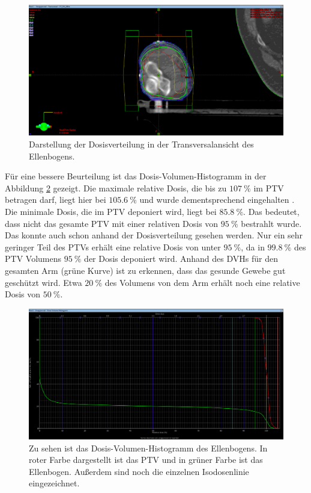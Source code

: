 \begin{figure}[H]
	\centering
	\includegraphics[width=\textwidth]{../Bilder/EllenbogenZ.png}
	\caption{Darstellung der Dosisverteilung in der Transversalansicht des Ellenbogens.}
	\label{fig:ellenbogenz}
\end{figure}

Für eine bessere Beurteilung ist das Dosis-Volumen-Histogramm in der Abbildung \ref{fig:dvhellenbogeneinzel} gezeigt.
Die maximale relative Dosis, die bis zu $\SI{107}{\percent}$ im PTV betragen darf, liegt hier bei $\SI{105,6}{\percent}$
und wurde dementsprechend eingehalten \cite{ICRU}.
Die minimale Dosis, die im PTV deponiert wird, liegt bei $\SI{85,8}{\percent}$.
Das bedeutet, dass nicht das gesamte PTV mit einer relativen Dosis von $\SI{95}{\percent}$ bestrahlt wurde.
Das konnte auch schon anhand der Dosisverteilung gesehen werden.
Nur ein sehr geringer Teil des PTVs erhält eine relative Dosis von unter $\SI{95}{\percent}$, da in $\SI{99.8}{\percent}$ des PTV Volumens
$\SI{95}{\percent}$ der Dosis deponiert wird.
Anhand des DVHs für den gesamten Arm (grüne Kurve) ist zu erkennen, dass das gesunde Gewebe gut geschützt wird.
Etwa $\SI{20}{\percent}$ des Volumens von dem Arm erhält noch eine relative Dosis von $\SI{50}{\percent}$.

\begin{figure}[H]
	\centering
	\includegraphics[width=\textwidth]{../Bilder/DVH_EllenbogenEinzel.png}
	\caption{Zu sehen ist das Dosis-Volumen-Histogramm des Ellenbogens. In roter Farbe dargestellt ist das PTV und in grüner Farbe ist das Ellenbogen. Außerdem sind noch die einzelnen Isodosenlinie eingezeichnet.}
	\label{fig:dvhellenbogeneinzel}
\end{figure}


